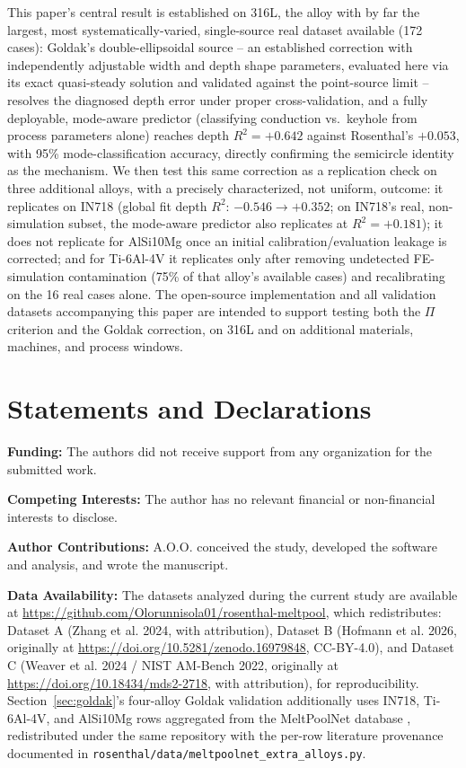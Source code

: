 \documentclass[12pt]{article}
\begin{document}
This paper's central result is established on 316L, the alloy with by far the largest, most systematically-varied, single-source real dataset available (172 cases): Goldak's double-ellipsoidal source -- an established correction with independently adjustable width and depth shape parameters, evaluated here via its exact quasi-steady solution and validated against the point-source limit -- resolves the diagnosed depth error under proper cross-validation, and a fully deployable, mode-aware predictor (classifying conduction vs.\ keyhole from process parameters alone) reaches depth $R^2=+0.642$ against Rosenthal's $+0.053$, with 95\% mode-classification accuracy, directly confirming the semicircle identity as the mechanism. We then test this same correction as a replication check on three additional alloys, with a precisely characterized, not uniform, outcome: it replicates on IN718 (global fit depth $R^2$: $-0.546\rightarrow+0.352$; on IN718's real, non-simulation subset, the mode-aware predictor also replicates at $R^2=+0.181$); it does not replicate for AlSi10Mg once an initial calibration/evaluation leakage is corrected; and for Ti-6Al-4V it replicates only after removing undetected FE-simulation contamination (75\% of that alloy's available cases) and recalibrating on the 16 real cases alone. The open-source implementation and all validation datasets accompanying this paper are intended to support testing both the $\Pi$ criterion and the Goldak correction, on 316L and on additional materials, machines, and process windows.

\section*{Statements and Declarations}

\noindent\textbf{Funding:} The authors did not receive support from any organization for the submitted work.

\noindent\textbf{Competing Interests:} The author has no relevant financial or non-financial interests to disclose.

\noindent\textbf{Author Contributions:} A.O.O. conceived the study, developed the software and analysis, and wrote the manuscript.

\noindent\textbf{Data Availability:} The datasets analyzed during the current study are available at \url{https://github.com/Olorunnisola01/rosenthal-meltpool}, which redistributes: Dataset A (Zhang et al. 2024, with attribution), Dataset B (Hofmann et al. 2026, originally at \url{https://doi.org/10.5281/zenodo.16979848}, CC-BY-4.0), and Dataset C (Weaver et al. 2024 / NIST AM-Bench 2022, originally at \url{https://doi.org/10.18434/mds2-2718}, with attribution), for reproducibility. Section~\ref{sec:goldak}'s four-alloy Goldak validation additionally uses IN718, Ti-6Al-4V, and AlSi10Mg rows aggregated from the MeltPoolNet database \cite{meltpoolnet2022}, redistributed under the same repository with the per-row literature provenance documented in \texttt{rosenthal/data/meltpoolnet\_extra\_alloys.py}.
\end{document}
